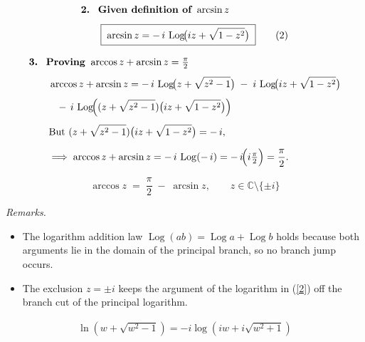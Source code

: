 \documentclass[12pt]{article}
\DeclareMathOperator{\Log}{Log}
\theoremstyle{definition} %
\theoremstyle{plain} %
\begin{document}
  \bigskip
  
  \begin{align*}
  &\textbf{2.\; Given definition of } \arcsin z \\[4pt]
  &\qquad
  \boxed{\;
     \displaystyle
     \arcsin z = -\,i\,\Log\!\bigl( iz + \sqrt{1-z^{2}} \bigr)
    \;}
  \tag{2}
  \end{align*}
  
  \bigskip
  
  \begin{align*}
  &\textbf{3.\; Proving } \arccos z + \arcsin z = \tfrac{\pi}{2}\\[4pt]
  &\qquad
  \arccos z + \arcsin z
    = -\,i\,\Log\!\bigl(z+\sqrt{z^{2}-1}\bigr)
      \;-\;
      i\,\Log\!\bigl( iz + \sqrt{1-z^{2}}\bigr) \\[4pt]
  &\qquad
  \hphantom{=} -\,i\,
     \Log\!\Bigl(
        (z+\sqrt{z^{2}-1})
        \bigl( iz + \sqrt{1-z^{2}} \bigr)
     \Bigr) \\[4pt]
  &\qquad
  \text{But } (z+\sqrt{z^{2}-1})
              \bigl( iz + \sqrt{1-z^{2}} \bigr)
          = -\,i, \\[6pt]
  &\qquad
  \Longrightarrow\;
  \arccos z + \arcsin z
     = -\,i\,\Log(-\,i)
     = -\,i\!\Bigl(i\tfrac{\pi}{2}\Bigr)
     = \frac{\pi}{2}.
  \end{align*}
  
  \bigskip
  
  \[
  \boxed{\;
     \arccos z \;=\; \frac{\pi}{2} \;-\; \arcsin z,
     \qquad z \in \mathbb{C} \setminus \{\pm i\}
   \;}
  \]
  
  \bigskip
  
  \noindent
  \emph{Remarks.}
  \begin{itemize}
    \item The logarithm addition law \(\Log(ab)=\Log a+\Log b\) holds
          because both arguments lie in the domain of the principal branch,
          so no branch jump occurs.
    \item The exclusion \(z=\pm i\) keeps the argument of the logarithm in
          (\ref{2}) off the branch cut of the principal logarithm.
  \end{itemize}
  \begin{align}
    \ln(w + \sqrt{w^{2}-1}) = -i\log(iw + i\sqrt{w^{2}+1})  
  \end{align}
  \pagebreak
\end{document}
